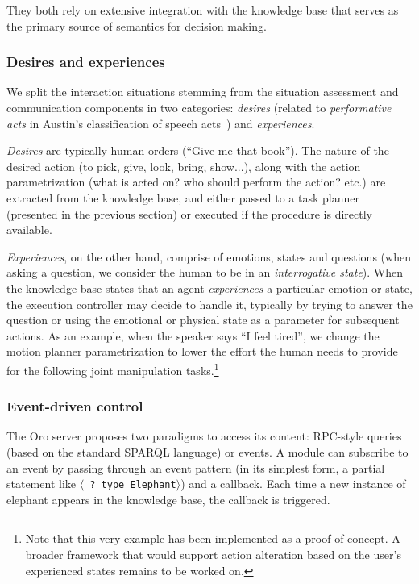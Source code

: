 \documentclass[preprint,3p,times]{elsarticle}
\newcommand{\stmt}[1]{{\footnotesize \tt $\langle$ #1\relax$\rangle$}}
\begin{document}
They both rely on extensive integration with the knowledge base that serves as the
primary source of semantics for decision making.



\subsubsection{Desires and experiences}

We split the interaction situations stemming from the situation assessment and
communication components in two categories: \emph{desires} (related to
\emph{performative acts} in Austin's classification of speech
acts~\cite{Austin1962}) and \emph{experiences}.

\emph{Desires} are typically human orders (``Give me that book''). The nature
of the desired action (to pick, give, look, bring, show...), along with the
action parametrization (what is acted on? who should perform the action? etc.)
are extracted from the knowledge base, and either passed to a task planner
(presented in the previous section) or executed if the procedure is directly
available.

\emph{Experiences}, on the other hand, comprise of emotions, states and
questions (when asking a question, we consider the human to be in an
\emph{interrogative state}). When the knowledge base states that an agent
\emph{experiences} a particular emotion or state, the execution controller may
decide to handle it, typically by trying to answer the question or using the
emotional or physical state as a parameter for subsequent actions. As an
example, when the speaker says ``I feel tired'', we change the motion planner
parametrization to lower the effort the human needs to provide for the following
joint manipulation tasks.\footnote{Note that this very example has been
implemented as a proof-of-concept. A broader framework that would support
action alteration based on the user's experienced states remains to be worked on.}

\subsubsection{Event-driven control}

The {\sc Oro} server proposes two paradigms to access its content: RPC-style
queries (based on the standard SPARQL language) or events. A module can
subscribe to an event by passing through an event pattern (in its simplest
form, a partial statement like \stmt{? type Elephant}) and a callback.  Each
time a new instance of elephant appears in the knowledge base, the callback is
triggered.
\end{document}
